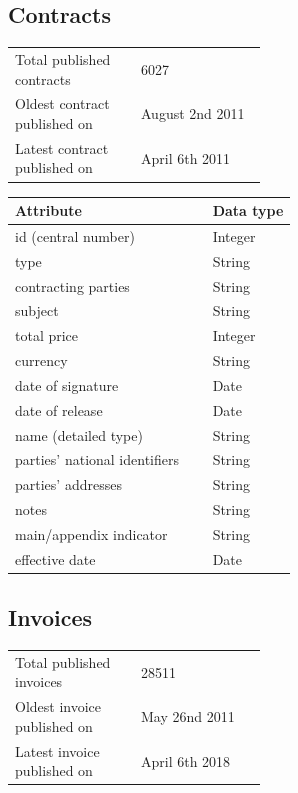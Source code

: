 \documentclass[thesis=B,english]{FITthesis}[2012/06/26]
\begin{document}
	\subsection{Contracts}
        \begin{tabular}{  p{0.5\linewidth}  l }
        \\
        Total published contracts & 6027 \\
        Oldest contract published on & August 2nd 2011\\
        Latest contract published on & April 6th 2011 \\
        \end{tabular}
        
    \begin{center}
        \begin{tabular}{  p{0.7\linewidth} | p{0.3\linewidth} }
        Attribute & Data type\\ \hline
        id (central number) & Integer \\
        type & String \\
        contracting parties & String \\
        subject & String \\
        total price & Integer \\
        currency & String \\
        date of signature & Date \\
        date of release & Date \\
        name (detailed type) & String \\
        parties' national identifiers & String \\
        parties' addresses & String \\
        notes & String \\
        main/appendix indicator & String \\
        effective date & Date \\
        \end{tabular}
    \end{center}
	\subsection{Invoices}
	\begin{tabular}{  p{0.5\linewidth}  l }
        \\
        Total published invoices & 28511 \\
        Oldest invoice published on & May 26nd 2011\\
        Latest invoice published on & April 6th 2018 \\
        \end{tabular}
        
\end{document}
